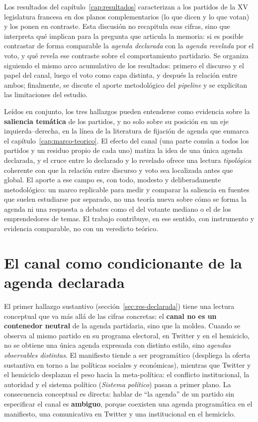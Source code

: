 Los resultados del capítulo~\ref{cap:resultados} caracterizan a los partidos de
la XV legislatura francesa en dos planos complementarios (lo que dicen y lo
que votan) y los ponen en contraste. Esta discusión no recapitula esas cifras,
sino que interpreta qué implican para la pregunta que articula la memoria: si es
posible contrastar de forma comparable la \emph{agenda declarada} con la
\emph{agenda revelada} por el voto, y qué revela ese contraste sobre el
comportamiento partidario. Se organiza siguiendo el mismo arco acumulativo de los
resultados: primero el discurso y el papel del canal, luego el voto como capa
distinta, y después la relación entre ambos; finalmente, se discute el aporte
metodológico del \emph{pipeline} y se explicitan las limitaciones del estudio.

Leídos en conjunto, los tres hallazgos pueden entenderse como evidencia sobre la
\textbf{saliencia temática} de los partidos, y no solo sobre su posición en un eje
izquierda--derecha, en la línea de la literatura de fijación de agenda que enmarca
el capítulo~\ref{cap:marco-teorico}. El efecto del canal (una parte común a todos
los partidos y un residuo propio de cada uno) matiza la idea de una única agenda
declarada, y el cruce entre lo declarado y lo revelado ofrece una lectura
\emph{tipológica} coherente con que la relación entre discurso y voto sea
localizada antes que global. El aporte a ese campo es, con todo, modesto y
deliberadamente metodológico: un marco replicable para medir y comparar la
saliencia en fuentes que suelen estudiarse por separado, no una teoría nueva sobre
cómo se forma la agenda ni una respuesta a debates como el del votante mediano o
el de los emprendedores de temas. El trabajo contribuye, en ese sentido, con
instrumento y evidencia comparable, no con un veredicto teórico.

\section{El canal como condicionante de la agenda declarada}
\label{sec:disc-canal}

El primer hallazgo sustantivo (sección~\ref{sec:res-declarada}) tiene una
lectura conceptual que va más allá de las cifras concretas: el \textbf{canal no
es un contenedor neutral} de la agenda partidaria, sino que la moldea. Cuando se observa al mismo
partido en su programa electoral, en Twitter y en el hemiciclo, no se obtiene una
única agenda expresada con distinto estilo, sino \emph{agendas observables
distintas}. El manifiesto tiende a ser programático (despliega la oferta
sustantiva en torno a las políticas sociales y económicas), mientras que
Twitter y el hemiciclo desplazan el peso hacia la meta-política: el conflicto
institucional, la autoridad y el sistema político (\emph{Sistema político}) pasan
a primer plano. La consecuencia conceptual es directa: hablar de ``la agenda'' de
un partido sin especificar el canal es \textbf{ambiguo}, porque coexisten una
agenda programática en el manifiesto, una comunicativa en Twitter y una
institucional en el hemiciclo.

